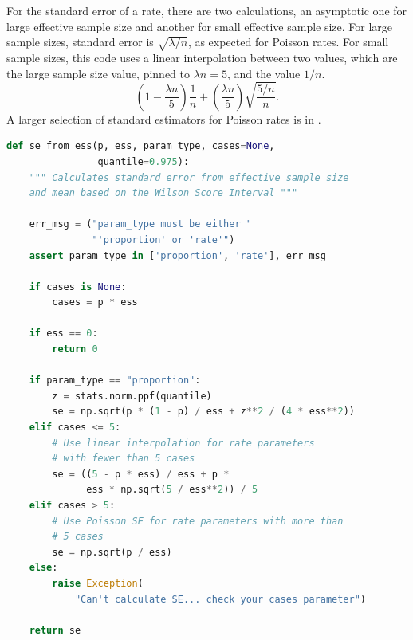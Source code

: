 \documentclass[fleqn,10pt]{olplainarticle}
\begin{document}
For the standard error of a rate, there are two calculations, an asymptotic one
for large effective sample size and another for small effective sample size.
For large sample sizes, standard error is $\sqrt{\lambda/n}$, as expected for Poisson
rates. For small sample sizes, this code uses a linear interpolation between two values,
which are the large sample size value, pinned to $\lambda n=5$, and the value $1/n$.
\begin{equation}
    \left(1-\frac{\lambda n}{5}\right) \frac{1}{n} + \left(\frac{\lambda n}{5}\right)\sqrt{\frac{5/n}{n}}.
\end{equation}
A larger selection of standard estimators for Poisson rates is in \citet{patil2012}.

\begin{lstlisting}[language=Python]
def se_from_ess(p, ess, param_type, cases=None,
                quantile=0.975):
    """ Calculates standard error from effective sample size
    and mean based on the Wilson Score Interval """

    err_msg = ("param_type must be either "
               "'proportion' or 'rate'")
    assert param_type in ['proportion', 'rate'], err_msg

    if cases is None:
        cases = p * ess

    if ess == 0:
        return 0

    if param_type == "proportion":
        z = stats.norm.ppf(quantile)
        se = np.sqrt(p * (1 - p) / ess + z**2 / (4 * ess**2))
    elif cases <= 5:
        # Use linear interpolation for rate parameters
        # with fewer than 5 cases
        se = ((5 - p * ess) / ess + p *
              ess * np.sqrt(5 / ess**2)) / 5
    elif cases > 5:
        # Use Poisson SE for rate parameters with more than
        # 5 cases
        se = np.sqrt(p / ess)
    else:
        raise Exception(
            "Can't calculate SE... check your cases parameter")

    return se
\end{lstlisting}
\end{document}
